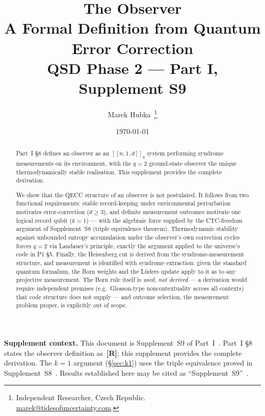 \documentclass[11pt,a4paper]{article}
\title{
  \textbf{The Observer}\\[0.5em] 
  \Large A Formal Definition from Quantum Error Correction\\[0.8em]
  \large QSD Phase 2 --- Part I, Supplement S9
}
\author{Marek Hubka\, \orcidlink{0009-0003-2476-9017}
  \thanks{Independent Researcher, Czech Republic.\; \\
    \href{mailto:marek@tidesofuncertainty.com}{marek@tidesofuncertainty.com}.}}
\date{\today}
\newcommand{\Rmark}{\textcolor{green!50!black}{\textbf{[R]}}}
\begin{document}
\maketitle

\begin{abstract}
\noindent
Part~I \S8 defines an observer as an $[\![n,1,d]\!]_q$ system performing syndrome measurements on its environment, with the $q=2$ ground-state observer the unique thermodynamically stable realisation. This supplement provides the complete derivation.

We show that the QECC structure of an observer is not postulated. It follows from two functional requirements: stable record-keeping under environmental perturbation motivates error-correction ($d\geq3$), and definite measurement outcomes motivate one logical record qubit ($k=1$) --- with the algebraic force supplied by the CTC-freedom argument of Supplement~S8 (triple equivalence theorem). Thermodynamic stability against unbounded entropy accumulation under the observer's own correction cycles forces $q=2$ via Landauer's principle, exactly the argument applied to the universe's code in P1 \S5. Finally, the Heisenberg cut is derived from the syndrome-measurement structure, and measurement is identified with syndrome extraction: given the standard quantum formalism, the Born weights and the L\"uders update apply to it as to any projective measurement. The Born rule itself is \emph{used, not derived} --- a derivation would require independent premises (e.g.\ Gleason-type noncontextuality across all contexts) that code structure does not supply --- and outcome selection, the measurement problem proper, is explicitly out of scope.
\end{abstract}

\begin{mdframed}[backgroundcolor=insightbg,linecolor=insightcol,
  linewidth=1.5pt, skipabove=8pt, skipbelow=8pt]
\textbf{Supplement context.}\quad
This document is Supplement~S9 of Part~I~\cite{Hubka2026QSD}. Part~I \S8 states the observer definition as~\Rmark; this supplement provides the complete derivation. The $k=1$ argument (\S\ref{sec:k1}) uses the triple equivalence proved in Supplement~S8~\cite{Hubka2026QSDSupp}. Results established here may be cited as ``Supplement~S9''~\cite{Hubka2026QSDSupp}.
\end{mdframed}

\newpage
\tableofcontents
\newpage
\end{document}
